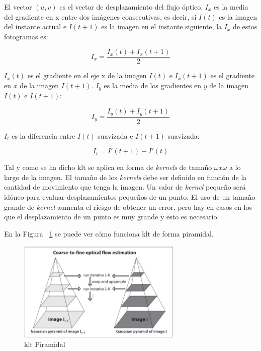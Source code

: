El vector $(u,v)$ es el vector de desplazamiento del flujo óptico.
$I_x$ es la media del gradiente en x entre dos imágenes consecutivas, es decir, si $I(t)$ es la imagen del instante actual e $I(t+1)$ es la imagen en el instante siguiente, la $I_x$ de estos fotogramas es:

\begin{equation}
    I_x = \frac{I_x(t)+I_x(t+1)}{2}
\end{equation}

$I_x(t)$ es el gradiente en el eje x de la imagen $I(t)$ e $I_x(t+1)$ es el gradiente en $x$ de la imagen $I(t+1)$. $I_y$ es la media de los gradientes en $y$ de la imagen $I(t)$ e $I(t+1)$:

\begin{equation}
    I_y = \frac{I_y(t)+I_y(t+1)}{2}
\end{equation}

$I_t$ es la diferencia entre $I(t)$ suavizada e $I(t+1)$ suavizada:

\begin{equation}
   I_t = I'(t+1) - I'(t) 
\end{equation}

Tal y como se ha dicho \acrshort{klt} se aplica en forma de \textit{kernels} de tamaño $\omega x \omega$ a lo largo de la imagen. El tamaño de los \textit{kernels} debe ser definido en función de la cantidad de movimiento que tenga la imagen. Un valor de \textit{kernel} pequeño será idóneo para evaluar desplazamientos pequeños de un punto. El uso de un tamaño grande de \textit{kernel} aumenta el riesgo de obtener un error, pero hay en casos en los que el desplazamiento de un punto es muy grande y esto es necesario.

En la Figura ~\ref{fig.klt_piramidal} se puede ver cómo funciona \acrshort{klt} de forma piramidal.

 \begin{figure}[H] 
\begin{center}
	\includegraphics[width=0.7\textwidth]{figures/Diseno_global/klt_piramidal.png}
   \caption{\acrshort{klt} Piramidal}
	\label{fig.klt_piramidal}
\end{center}
\end{figure}

